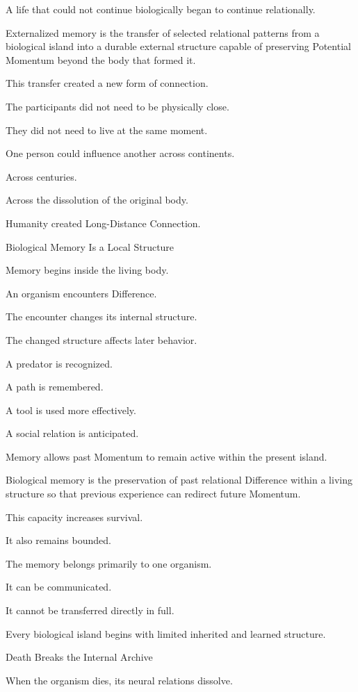 A life that could not continue biologically began to continue relationally.

Externalized memory is the transfer of selected relational patterns from a biological island into a durable external structure capable of preserving Potential Momentum beyond the body that formed it.

This transfer created a new form of connection.

The participants did not need to be physically close.

They did not need to live at the same moment.

One person could influence another across continents.

Across centuries.

Across the dissolution of the original body.

Humanity created Long-Distance Connection.

Biological Memory Is a Local Structure

Memory begins inside the living body.

An organism encounters Difference.

The encounter changes its internal structure.

The changed structure affects later behavior.

A predator is recognized.

A path is remembered.

A tool is used more effectively.

A social relation is anticipated.

Memory allows past Momentum to remain active within the present island.

Biological memory is the preservation of past relational Difference within a living structure so that previous experience can redirect future Momentum.

This capacity increases survival.

It also remains bounded.

The memory belongs primarily to one organism.

It can be communicated.

It cannot be transferred directly in full.

Every biological island begins with limited inherited and learned structure.

Death Breaks the Internal Archive

When the organism dies, its neural relations dissolve.


